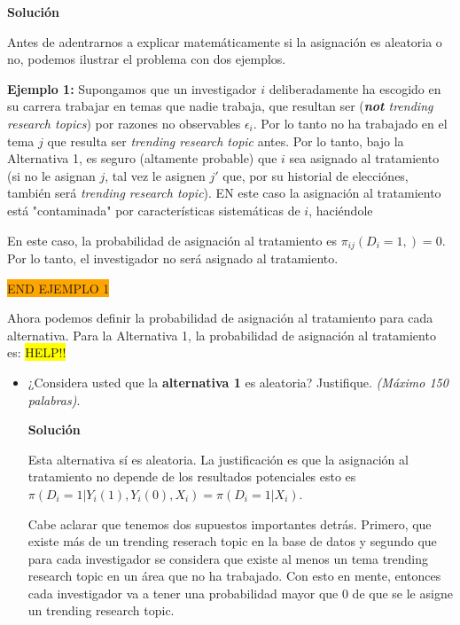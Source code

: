 \documentclass[a4paper, answers, addpoints, 11pt]{exam}
\newenvironment{solucion}{%
  \begin{mdframed}[
    backgroundcolor=blue!5,    %
    linecolor=blue!50,          %
    linewidth=2pt,              %
    leftmargin=10pt,            %
    rightmargin=10pt,           %
    topline=true,              %
    bottomline=true,            %
    roundcorner=10pt,           %
    innerleftmargin=10pt,       %
    innerrightmargin=10pt,      %
    innerbottommargin=10pt,     %
    innertopmargin=10pt         %
  ]%
  \begin{tcolorbox}[colframe=blue!50!black, colback=blue!50, coltitle=white, sharp corners=all, boxrule=1mm, width=\textwidth, halign=left, valign=center, top=0mm, bottom=0mm, left=0mm, right=0mm] \textbf{Solución} \end{tcolorbox} }{\end{mdframed}}
\begin{document}
\begin{itemize}
\begin{solucion}
Antes de adentrarnos a explicar matemáticamente si la asignación es aleatoria o no, podemos ilustrar el problema con dos ejemplos.

\textbf{Ejemplo 1:} Supongamos que un investigador $i$ deliberadamente ha escogido en su carrera trabajar en temas que nadie trabaja, que resultan ser (\textit{\textbf{not} trending research topics}) por razones no observables $\epsilon_i$. Por lo tanto no ha trabajado en el tema $j$ que resulta ser \textit{trending research topic} antes. Por lo tanto, bajo la Alternativa 1, es seguro (altamente probable) que $i$ sea asignado al tratamiento (si no le asignan $j$, tal vez le asignen $j'$ que, por su historial de elecciónes, también será \textit{trending research topic}). EN este caso la asignación al tratamiento está "contaminada" por características sistemáticas de $i$, haciéndole 

En este caso, la probabilidad de asignación al tratamiento es $\pi_{ij}(D_i = 1, ) = 0$. Por lo tanto, el investigador no será asignado al tratamiento.

\colorbox{orange}{END EJEMPLO 1}

Ahora podemos definir la probabilidad de asignación al tratamiento para cada alternativa. Para la Alternativa 1, la probabilidad de asignación al tratamiento es:
\colorbox{yellow}{HELP!!}

 
    \end{solucion}
    
    \begin{itemize}
        \item ¿Considera usted que la \textbf{alternativa 1} es aleatoria? Justifique. \textit{(Máximo 150 palabras)}.
         \begin{solucion}
             
      Esta alternativa sí es aleatoria. La justificación es que la asignación al tratamiento no depende de los resultados potenciales esto es $\pi(D_i = 1 | Y_i(1), Y_i(0), X_i) = \pi(D_i = 1 | X_i)$. 
      
      Cabe aclarar que tenemos dos supuestos importantes detrás. Primero, que existe más de un trending reserach topic en la base de datos y segundo que para cada investigador se considera que existe al menos un tema trending research topic en un área que no ha trabajado. Con esto en mente, entonces cada investigador va a tener una probabilidad mayor que 0 de que se le asigne un trending research topic.
      

\end{solucion}
\end{itemize}
\end{itemize}
\end{document}
